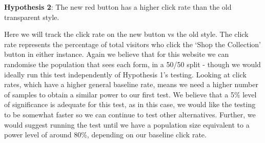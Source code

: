 \documentclass[12pt, authoryear]{elsarticle}
\begin{document}
\textbf{Hypothesis 2}: The new red button has a higher click rate than the old transparent style.

Here we will track the click rate on the new button vs the old style. The click rate represents the percentage of total visitors who click the ‘Shop the Collection’ button in either instance. Again we believe that for this website we can randomise the population that sees each form, in a 50/50 split - though we would ideally run this test independently of Hypothesis 1’s testing. Looking at click rates, which have a higher general baseline rate, means we need a higher number of samples to obtain a similar power to our first test.  We believe that a 5\% level of significance is adequate for this test, as in this case, we would like the testing to be somewhat faster so we can continue to test other alternatives. Further, we would suggest running the test until we have a population size equivalent to a power level of around 80\%, depending on our baseline click rate.
\end{document}
